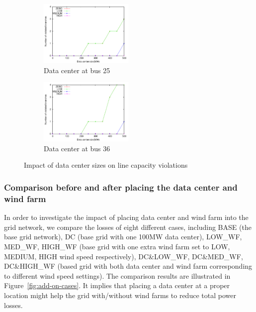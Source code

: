 \begin{figure} [ht]

\begin{subfigure}{0.23\textwidth}
  \centering
  \includegraphics[width=4.5cm]{img/size_vio_bus25}
  \caption{Data center at bus 25}
  \label{fig:a:bus25}
\end{subfigure}
\begin{subfigure}{.23\textwidth}
  \centering
  \includegraphics[width=4.5cm]{img/size_vio_bus36}
  \caption{Data center at bus 36}
   \label{fig:b:bus36}
\end{subfigure}
\caption{Impact of data center sizes on line capacity violations}
\label{fig:dc_size_vio}

\end{figure}

\subsubsection{Comparison before and after placing the data center and wind farm}

In order to investigate the impact of placing data center and wind farm into the grid network, we compare the losses of eight different cases, including BASE (the base grid network), DC (base grid with one 100MW data center), LOW\_WF, MED\_WF, HIGH\_WF (base grid with one extra wind farm set to LOW, MEDIUM, HIGH wind speed respectively), DC\&LOW\_WF, DC\&MED\_WF, DC\&HIGH\_WF (based grid with both data center and wind farm corresponding to different wind speed settings). The comparison results are illustrated in Figure~\ref{fig:add-on-cases}. It implies that  placing a data center at a proper location might help the grid with/without wind farms to reduce total power losses.


